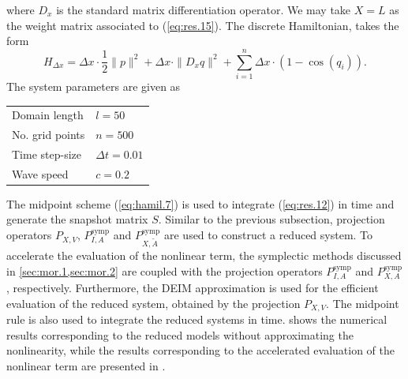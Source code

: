 where $D_x$ is the standard matrix differentiation operator. We may take $X = L$ as the weight matrix associated to (\ref{eq:res.15}). The discrete Hamiltonian, takes the form
\begin{equation} \label{eq:res.17}
	H_{\Delta x} = \Delta x \cdot \frac 1 2 \| p \|^2 + \Delta x \cdot \| D_x q \|^2 + \sum_{i=1}^{n} \Delta x \cdot ( 1 - \cos(q_i) ).
\end{equation}
The system parameters are given as
\vspace{0.5cm}
\begin{center}
\begin{tabular}{|l|l|}
\hline
Domain length & $l = 50$ \\
No. grid points & $n = 500$ \\
Time step-size & $\Delta t = 0.01$ \\
Wave speed & $c=0.2$ \\
\hline
\end{tabular}
\end{center}
\vspace{0.5cm}
The midpoint scheme (\ref{eq:hamil.7}) is used to integrate (\ref{eq:res.12}) in time and generate the snapshot matrix $S$. Similar to the previous subsection, projection operators $P_{X,V}$, $P^{\text{symp}}_{I,A}$ and $P^{\text{symp}}_{X,\tilde A}$ are used to construct a reduced system. To accelerate the evaluation of the nonlinear term, the symplectic methods discussed in \cref{sec:mor.1,sec:mor.2} are coupled with the projection operators $P^{\text{symp}}_{I,A}$ and $P^{\text{symp}}_{X,A}$, respectively. Furthermore, the DEIM approximation is used for the efficient evaluation of the reduced system, obtained by the projection $P_{X,V}$. The midpoint rule is also used to integrate the reduced systems in time.  shows the numerical results corresponding to the reduced models without approximating the nonlinearity, while the results corresponding to the accelerated evaluation of the nonlinear term are presented in .

